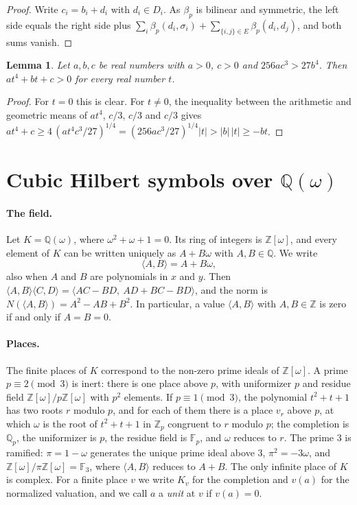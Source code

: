 \documentclass[11pt]{article}
\newtheorem{lemma}[theorem]{Lemma}
\newcommand{\Z}{\mathbb{Z}}
\newcommand{\Q}{\mathbb{Q}}
\newcommand{\F}{\mathbb{F}}
\begin{document}
\begin{proof}
Write $c_i=b_i+d_i$ with $d_i\in D_i$. As $\beta_p$ is bilinear and symmetric, the left side equals the right side plus $\sum_i\beta_p(d_i,\sigma_i)+\sum_{\{i,j\}\in E}\beta_p(d_i,d_j)$, and both sums vanish.
\end{proof}

\begin{lemma}\label{lem:amgm}
Let $a,b,c$ be real numbers with $a>0$, $c>0$ and $256ac^3>27b^4$. Then $at^4+bt+c>0$ for every real number $t$.
\end{lemma}

\begin{proof}
For $t=0$ this is clear. For $t\neq0$, the inequality between the arithmetic and geometric means of $at^4$, $c/3$, $c/3$ and $c/3$ gives $at^4+c\geq4\,(at^4c^3/27)^{1/4}=(256ac^3/27)^{1/4}|t|>|b|\,|t|\geq-bt$.
\end{proof}



\section{\texorpdfstring{Cubic Hilbert symbols over $\Q(\omega)$}{Cubic Hilbert symbols over Q(w)}}\label{sec:csymbols}

\paragraph{The field.} Let $K=\Q(\omega)$, where $\omega^2+\omega+1=0$. Its ring of integers is $\Z[\omega]$, and every element of $K$ can be written uniquely as $A+B\omega$ with $A,B\in\Q$. We write
\[
\langle A,B\rangle=A+B\omega,
\]
also when $A$ and $B$ are polynomials in $x$ and $y$. Then $\langle A,B\rangle\langle C,D\rangle=\langle AC-BD,\ AD+BC-BD\rangle$, and the norm is $N(\langle A,B\rangle)=A^2-AB+B^2$. In particular, a value $\langle A,B\rangle$ with $A,B\in\Z$ is zero if and only if $A=B=0$.

\paragraph{Places.} The finite places of $K$ correspond to the non-zero prime ideals of $\Z[\omega]$. A prime $p\equiv2\pmod3$ is inert: there is one place above $p$, with uniformizer $p$ and residue field $\Z[\omega]/p\Z[\omega]$ with $p^2$ elements. If $p\equiv1\pmod3$, the polynomial $t^2+t+1$ has two roots $r$ modulo $p$, and for each of them there is a place $v_r$ above $p$, at which $\omega$ is the root of $t^2+t+1$ in $\Z_p$ congruent to $r$ modulo $p$; the completion is $\Q_p$, the uniformizer is $p$, the residue field is $\F_p$, and $\omega$ reduces to $r$. The prime $3$ is ramified: $\pi=1-\omega$ generates the unique prime ideal above $3$, $\pi^2=-3\omega$, and $\Z[\omega]/\pi\Z[\omega]=\F_3$, where $\langle A,B\rangle$ reduces to $A+B$. The only infinite place of $K$ is complex. For a finite place $v$ we write $K_v$ for the completion and $v(a)$ for the normalized valuation, and we call $a$ a \emph{unit} at $v$ if $v(a)=0$.
\end{document}
